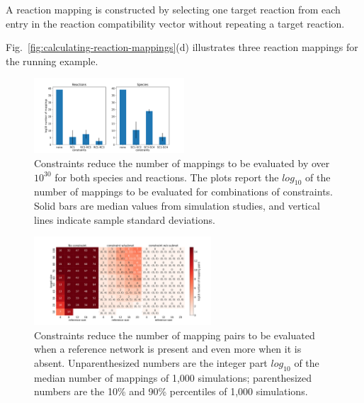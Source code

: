 \documentclass[webpdf,contemporary,large]{oup-authoring-template}
\newcommand{\fig}[1]{
  Fig.~\ref{#1}}
\theoremstyle{thmstyleone}%
\theoremstyle{thmstyletwo}%
\theoremstyle{thmstylethree}%
\begin{document}
A reaction mapping is constructed by selecting one target reaction
from each entry in the reaction compatibility vector without repeating a target reaction.
\fig{fig:calculating-reaction-mappings}(d) illustrates three reaction mappings for the running example.

\begin{figure}
\includegraphics[width=0.5\textwidth, angle=0]{figures/evaluate_constraints.pdf}
\caption{Constraints reduce the number of mappings to be evaluated by over $10^{30}$ for both species and reactions. The plots report the $log_{10}$ of the number of mappings to be evaluated for combinations of constraints. Solid bars are median values from simulation studies, and vertical lines indicate sample standard deviations.}
\label{fig:constraint-effectiveness}
\end{figure}

\begin{figure}
\hspace{-.4in}
\includegraphics[width=0.59\textwidth, angle=0]{figures/scalable_subnet_discovery.pdf}
\caption{Constraints reduce the number of mapping pairs to be evaluated when a reference network is present and even more when it is absent.
Unparenthesized numbers are the integer part $log_{10}$ of the median number of mappings of 1,000 simulations; parenthesized numbers are the 10\% and 90\% percentiles of 1,000 simulations.}
\label{fig:scalable-subnet-discovery}
\end{figure}

\end{document}
